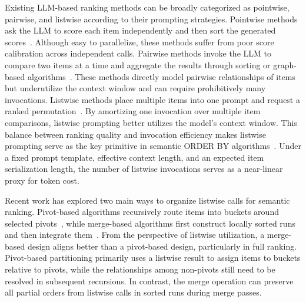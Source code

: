 Existing LLM-based ranking methods can be broadly categorized as pointwise, pairwise, and listwise according to their prompting strategies. 
Pointwise methods ask the LLM to score each item independently and then sort the generated scores~\cite{DBLP:conf/emnlp/DrozdovZD0RWAIM23, DBLP:conf/emnlp/SachanLJAYPZ22}. 
Although easy to parallelize, these methods suffer from poor score calibration across independent calls. 
Pairwise methods invoke the LLM to compare two items at a time and aggregate the results through sorting or graph-based algorithms~\cite{DBLP:conf/acl/LuoCH024, DBLP:conf/naacl/QinJHZWYSLLMWB24}. 
These methods directly model pairwise relationships of items but underutilize the context window and can require prohibitively many invocations. 
%
Listwise methods place multiple items into one prompt and request a ranked permutation~\cite{DBLP:conf/sigir/ZhuangZKZ24, DBLP:conf/emnlp/0001YMWRCYR23, DBLP:journals/corr/abs-2603-17223, DBLP:journals/corr/abs-2305-02156}. By amortizing one invocation over multiple item comparisons, listwise prompting better utilizes the model’s context window. 
This balance between ranking quality and invocation efficiency makes listwise prompting serve as the key primitive in semantic \textsf{ORDER BY} algorithms~\cite{DBLP:journals/corr/abs-2603-17223, DBLP:journals/corr/abs-2509-00303}. 
Under a fixed prompt template, effective context length, and an expected item serialization length, the number of listwise invocations serves as a near-linear proxy for token cost. 

Recent work has explored two main ways to organize listwise calls for semantic ranking. Pivot-based algorithms recursively route items into buckets around selected pivots~\cite{DBLP:journals/corr/abs-2603-17223}, while merge-based algorithms first construct locally sorted runs and then integrate them~\cite{DBLP:journals/corr/abs-2509-00303}. From the perspective of listwise utilization, a merge-based design aligns better than a pivot-based design, particularly in full ranking. Pivot-based partitioning primarily uses a listwise result to assign items to buckets relative to pivots, while the relationships among non-pivots still need to be resolved in subsequent recursions. In contrast, the merge operation can preserve all partial orders from listwise calls in sorted runs during merge passes.

